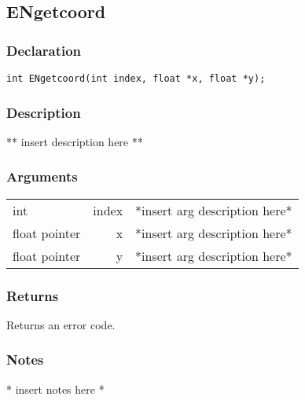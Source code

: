 \subsection{ENgetcoord}
\subsubsection{Declaration}
\begin{lstlisting}
int ENgetcoord(int index, float *x, float *y);
\end{lstlisting}
\subsubsection{Description}
** insert description here **
\subsubsection{Arguments}
\begin{tabular}{l r p{11cm} }
int&index&*insert arg description here* \\[6pt]
float pointer&x&*insert arg description here* \\[6pt]
float pointer&y&*insert arg description here* \\[6pt]
\end{tabular}
\subsubsection{Returns}
Returns an error code.
\subsubsection{Notes}
* insert notes here *